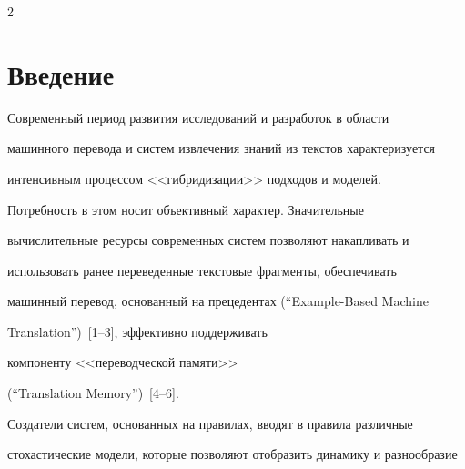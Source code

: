 









\begin{multicols}{2}





\section{Введение}





Современный период развития исследований и разработок в области


машинного перевода и сис\-тем извлечения знаний из текстов характеризуется


интенсивным процессом <<гибридизации>> подходов и моделей.


Потребность в этом носит объективный характер. Значительные


вычислительные ресурсы современных систем позволяют накапливать и


использовать ранее переведенные текстовые фрагменты, обеспечивать


машинный перевод, основанный на прецедентах (``Example-Based Machine


Translation'')~[1--3], эффективно поддерживать


компоненту <<переводческой памяти>>


(``Translation Memory'')~[4--6].





\label{st\stat}





\thispagestyle{headings}





Создатели систем, основанных на правилах, вводят в правила различные


стохастические модели, которые позволяют отобразить динамику и разнообразие 



\end{multicols}
